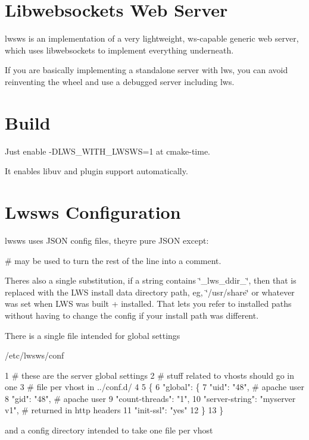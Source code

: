\hypertarget{md_README.lwsws_lwsws}{}\section{Libwebsockets Web Server}\label{md_README.lwsws_lwsws}
lwsws is an implementation of a very lightweight, ws-\/capable generic web server, which uses libwebsockets to implement everything underneath.

If you are basically implementing a standalone server with lws, you can avoid reinventing the wheel and use a debugged server including lws.\hypertarget{md_README.lwsws_lwswsb}{}\section{Build}\label{md_README.lwsws_lwswsb}
Just enable -\/\+D\+L\+W\+S\+\_\+\+W\+I\+T\+H\+\_\+\+L\+W\+S\+WS=1 at cmake-\/time.

It enables libuv and plugin support automatically.\hypertarget{md_README.lwsws_lwswsc}{}\section{Lwsws Configuration}\label{md_README.lwsws_lwswsc}
lwsws uses J\+S\+ON config files, they\textquotesingle{}re pure J\+S\+ON except\+:


\begin{DoxyItemize}
\item \textquotesingle{}\#\textquotesingle{} may be used to turn the rest of the line into a comment.
\item There\textquotesingle{}s also a single substitution, if a string contains \char`\"{}\+\_\+lws\+\_\+ddir\+\_\+\char`\"{}, then that is replaced with the L\+WS install data directory path, eg, \char`\"{}/usr/share\char`\"{} or whatever was set when L\+WS was built + installed. That lets you refer to installed paths without having to change the config if your install path was different.
\end{DoxyItemize}

There is a single file intended for global settings

/etc/lwsws/conf 
\begin{DoxyCode}
1 # these are the server global settings
2 # stuff related to vhosts should go in one
3 # file per vhost in ../conf.d/
4 
5 \{
6   "global": \{
7    "uid": "48",  # apache user
8    "gid": "48",  # apache user
9    "count-threads": "1",
10    "server-string": "myserver v1", # returned in http headers
11    "init-ssl": "yes"
12  \}
13 \}
\end{DoxyCode}
 and a config directory intended to take one file per vhost

